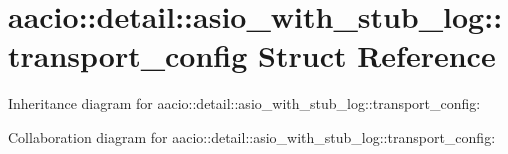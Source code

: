 \hypertarget{structaacio_1_1detail_1_1asio__with__stub__log_1_1transport__config}{}\section{aacio\+:\+:detail\+:\+:asio\+\_\+with\+\_\+stub\+\_\+log\+:\+:transport\+\_\+config Struct Reference}
\label{structaacio_1_1detail_1_1asio__with__stub__log_1_1transport__config}


Inheritance diagram for aacio\+:\+:detail\+:\+:asio\+\_\+with\+\_\+stub\+\_\+log\+:\+:transport\+\_\+config\+:


Collaboration diagram for aacio\+:\+:detail\+:\+:asio\+\_\+with\+\_\+stub\+\_\+log\+:\+:transport\+\_\+config\+:
